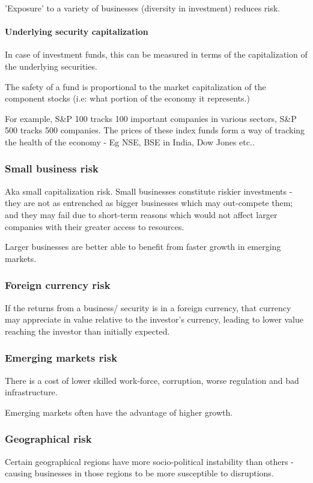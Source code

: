 \documentclass[oneside, article]{memoir}
\begin{document}
'Exposure' to a variety of businesses (diversity in investment) reduces risk.

\paragraph{Underlying security capitalization}
In case of investment funds, this can be measured in terms of the capitalization of the underlying securities.

The safety of a fund is proportional to the market capitalization of the component stocks (i.e: what portion of the economy it represents.)

For example, S\&P 100 tracks 100 important companies in various sectors, S\&P 500 tracks 500 companies. The prices of these index funds form a way of tracking the health of the economy - Eg NSE, BSE in India, Dow Jones etc..

\subsubsection{Small business risk}
Aka small capitalization risk. Small businesses constitute riskier investments - they are not as entrenched as bigger businesses which may out-compete them; and they may fail due to short-term reasons which would not affect larger companies with their greater access to resources.

Larger businesses are better able to benefit from faster growth in emerging markets.

\subsubsection{Foreign currency risk}
If the returns from a business/ security is in a foreign currency, that currency may appreciate in value relative to the investor's currency, leading to lower value reaching the investor than initially expected.

\subsubsection{Emerging markets risk}
There is a cost of lower skilled work-force, corruption, worse regulation and bad infrastructure.

Emerging markets often have the advantage of higher growth.

\subsubsection{Geographical risk}
Certain geographical regions have more socio-political instability than others - causing businesses in those regions to be more susceptible to disruptions. 
\end{document}
